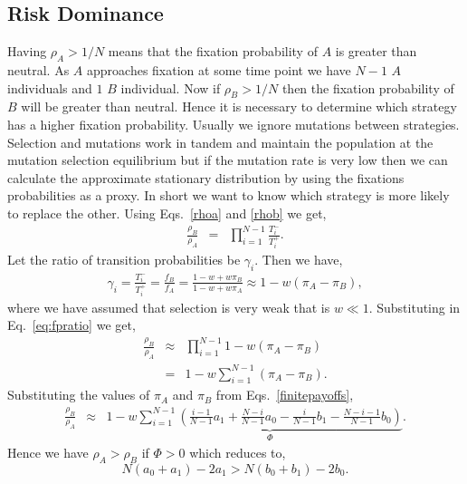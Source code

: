 \documentclass[oneside,11pt,a4paper]{book}
\begin{document}
\subsection{Risk Dominance}
\label{subsec:RD}
Having $\rho_A > 1/N$ means that the fixation probability of $A$ is greater than neutral.
As $A$ approaches fixation at some time point we have $N-1$ $A$ individuals and $1$ $B$ individual.
Now if $\rho_B > 1/N$ then the fixation probability of $B$ will be greater than neutral.
Hence it is necessary to determine which strategy has a higher fixation probability.
Usually we ignore mutations between strategies.
Selection and mutations work in tandem and maintain the population at the mutation selection equilibrium but if the mutation rate is very low then we can calculate the approximate stationary distribution by using the fixations probabilities as a proxy.
In short we want to know which strategy is more likely to replace the other.
Using Eqs.\ \eqref{rhoa} and \eqref{rhob} we get,
%
\begin{eqnarray}
\frac{\rho_B}{\rho_A} &=& \prod_{i=1}^{N-1} \frac{T_i^-}{T_i^+}.
\label{eq:fpratio}
\end{eqnarray}
%
Let the ratio of transition probabilities be $\gamma_i$.
Then we have,
%
\begin{eqnarray}
\gamma_i = \frac{T_i^-}{T_i^+} = \frac{f_B}{f_A} =\frac{1 - w + w \pi_B}{1 - w + w \pi_A} \approx 1 - w (\pi_A-\pi_B),
\end{eqnarray}
%
 where we have assumed that selection is very weak that is $w\ll1$.
Substituting in Eq.\ \eqref{eq:fpratio} we get,
%
\begin{eqnarray}
\frac{\rho_B}{\rho_A} &\approx& \prod_{i=1}^{N-1} 1 - w (\pi_A-\pi_B) \nonumber \\
&=& 1 - w \sum_{i=1}^{N-1} (\pi_A-\pi_B) \nonumber.
\end{eqnarray}
%
Substituting the values of $\pi_A$ and $\pi_B$ from Eqs.\ \eqref{finitepayoffs},
%
\begin{eqnarray}
\frac{\rho_B}{\rho_A} &\approx& 1 - w \underbrace{\sum_{i=1}^{N-1} \left(\frac{i-1}{N-1} a_1 + \frac{N-i}{N-1} a_0 - \frac{i}{N-1} b_1 - \frac{N-i-1}{N-1} b_0\right)}_{\Phi} \nonumber.
\end{eqnarray}
%
Hence we have $\rho_A > \rho_B$ if $\Phi > 0$ which reduces to,
%
\begin{equation}
N (a_0+a_1) - 2 a_1 > N (b_0+ b_1)-2 b_0.
\end{equation}
\end{document}
